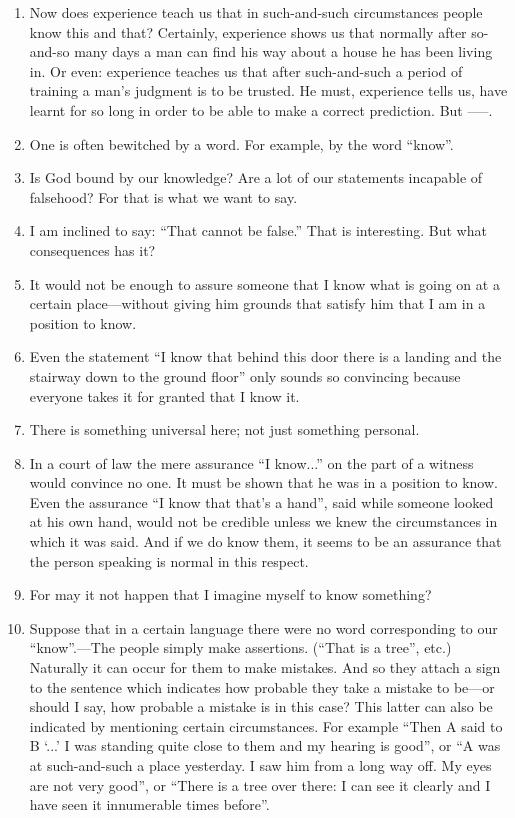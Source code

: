 \documentclass{book}
\begin{document}
\begin{enumerate}
\item
Now does experience teach us that in such-and-such circumstances people know
this and that? Certainly, experience shows us that normally after so-and-so
many days a man can find his way about a house he has been living in. Or even:
experience teaches us that after such-and-such a period of training a man's
judgment is to be trusted. He must, experience tells us, have learnt for so
long in order to be able to make a correct prediction. But -----.

\item
One is often bewitched by a word. For example, by the word ``know''.

\item
Is God bound by our knowledge? Are a lot of our statements incapable of
falsehood? For that is what we want to say.

\item
I am inclined to say: ``That cannot be false.'' That is interesting. But what
consequences has it?

\item
It would not be enough to assure someone that I know what is going on at a
certain place---without giving him grounds that satisfy him that I am in a
position to know.

\item
Even the statement ``I know that behind this door there is a landing and the
stairway down to the ground floor'' only sounds so convincing because everyone
takes it for granted that I know it.

\item
There is something universal here; not just something personal.

\item
In a court of law the mere assurance ``I know...'' on the part of a witness
would convince no one. It must be shown that he was in a position to know.
Even the assurance ``I know that that's a hand'', said while someone looked at
his own hand, would not be credible unless we knew the circumstances in which
it was said. And if we do know them, it seems to be an assurance that the
person speaking is normal in this respect.

\item
For may it not happen that I imagine myself to know something?

\item
Suppose that in a certain language there were no word corresponding to our
``know''.---The people simply make assertions. (``That is a tree'', etc.)
Naturally it can occur for them to make mistakes. And so they attach a sign to
the sentence which indicates how probable they take a mistake to be---or should
I say, how probable a mistake is in this case? This latter can also be
indicated by mentioning certain circumstances. For example ``Then A said to B
`...' I was standing quite close to them and my hearing is good'', or ``A was
at such-and-such a place yesterday. I saw him from a long way off. My eyes are
not very good'', or ``There is a tree over there: I can see it clearly and I
have seen it innumerable times before''.


\end{enumerate}
\end{document}
